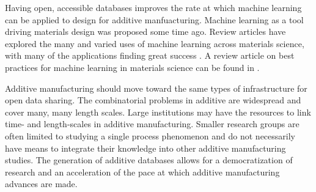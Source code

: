 Having open, accessible databases improves the rate at which machine learning can be applied to design for additive manfuacturing. Machine learning as a tool driving materials design was proposed some time ago. Review articles have explored the many and varied uses of machine learning across materials science, with many of the applications finding great success \cite{Kalidindi2016, Ramprasad2017, Gubernatis2018}. A review article on best practices for machine learning in materials science can be found in \cite{Wagner2016}. 

Additive manufacturing should move toward the same types of infrastructure for open data sharing. The combinatorial problems in additive are widespread and cover many, many length scales. Large institutions may have the resources to link time- and length-scales in additive manufacturing. Smaller research groups are often limited to studying a single process phenomenon and do not necessarily have means to integrate their knowledge into other additive manufacturing studies. The generation of additive databases allows for a democratization of research and an acceleration of the pace at which additive manufacturing advances are made. 
